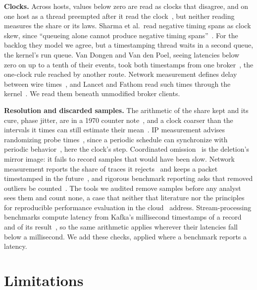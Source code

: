 \documentclass[10pt,journal,compsoc]{IEEEtran}
\newcommand{\kafka}{Kafka}
\begin{document}
\textbf{Clocks.} Across hosts, values below zero are read as clocks that disagree, and on one host
as a thread preempted after it read the clock~\cite{mckenney2023perfbook}, but neither reading
measures the share or its laws. Sharma et al.\ read negative timing spans as clock skew, since
``queueing alone cannot produce negative timing spans''~\cite{sharma2026causality}. For the backlog
they model we agree, but a timestamping thread waits in a second queue, the kernel's run queue.
Van Dongen and Van den Poel, seeing latencies below zero on up to a tenth of their events, took
both timestamps from one broker~\cite{vandongen2020evaluation}, the one-clock rule reached by
another route. Network measurement defines delay between wire times~\cite{rfc7679}, and Lancet and
Fathom read such times through the kernel~\cite{kogias2019lancet,qureshi2023fathom}. We read them
beneath unmodified broker clients.

\textbf{Resolution and discarded samples.} The arithmetic of the share kept and its cure, phase
jitter, are in a 1970 counter note~\cite{hp1970tia}, and a clock coarser than the intervals it
times can still estimate their mean~\cite{danzig1990highres}. IP measurement advises randomizing
probe times~\cite{rfc2330,baccelli2006pasta}, since a periodic schedule can synchronize with
periodic behavior~\cite{rfc3432}, here the clock's step. Coordinated omission~\cite{tene2015latency}
is the deletion's mirror image: it fails to record samples that would have been slow. Network
measurement reports the share of traces it rejects~\cite{paxson1998calibrating} and keeps a packet
timestamped in the future~\cite{rfc4656}, and rigorous benchmark reporting asks that removed
outliers be counted~\cite{georges2007rigorous,hoefler2015benchmarking}. The tools we audited
remove samples before any analyst sees them and count none, a case that neither that literature
nor the principles for reproducible performance evaluation in the
cloud~\cite{papadopoulos2021methodological} address. Stream-processing benchmarks compute latency
from \kafka{}'s millisecond timestamps of a record and of its result~\cite{henning2024shufflebench},
so the same arithmetic applies wherever their latencies fall below a millisecond. We add these
checks, applied where a benchmark reports a latency.


\section{Limitations}
\label{sec:threats}
\label{sec:limitations}
\end{document}
